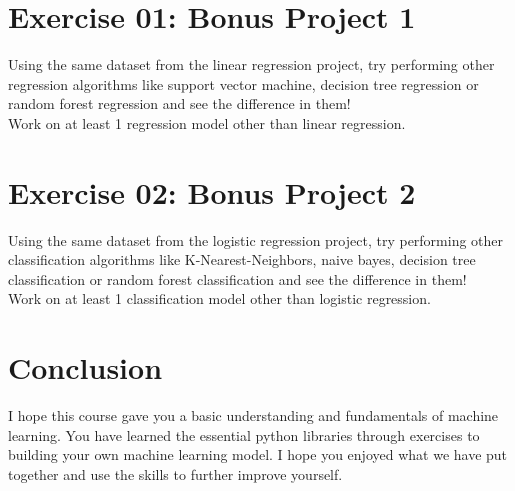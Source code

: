 \documentclass{42-en}
\begin{document}
\chapter{Exercise 01: Bonus Project 1}
\makeheaderfiles

Using the same dataset from the linear regression project, try performing other regression algorithms like support vector machine, decision tree regression or random forest regression and see the difference in them!\\

Work on at least 1 regression model other than linear regression.

\nextexercice
\newpage

\chapter{Exercise 02: Bonus Project 2}
\makeheaderfiles

Using the same dataset from the logistic regression project, try performing other classification algorithms like K-Nearest-Neighbors, naive bayes, decision tree classification or random forest classification and see the difference in them!\\

Work on at least 1 classification model other than logistic regression.

\nextexercice
\newpage


 \chapter{Conclusion}

I hope this course gave you a basic understanding and fundamentals of machine learning. You have learned the essential python libraries through exercises to building your own machine learning model. I hope you enjoyed what we have put together and use the skills to further improve yourself.\\
\end{document}
